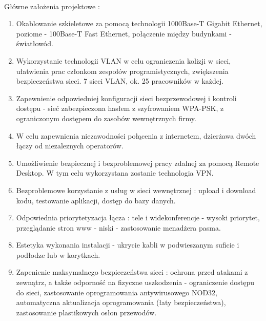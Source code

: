 \paragraph{}
Główne założenia projektowe :
\begin{enumerate}
	\item Okablowanie szkieletowe za pomocą technologii 1000Base-T Gigabit Ethernet, poziome - 100Base-T Fast Ethernet, połączenie między budynkami - światłowód.
	\item Wykorzystanie technologii VLAN w celu ograniczenia kolizji  w sieci, ułatwienia prac członkom zespołów programistycznych, zwiększenia bezpieczeństwa sieci. 7 sieci VLAN, ok. 25 pracowników w każdej.
	\item Zapewnienie odpowiedniej konfiguracji sieci bezprzewodowej i kontroli dostępu - sieć zabezpieczona hasłem z szyfrowaniem WPA-PSK, z ograniczonym dostępem do zasobów wewnętrznych firmy.
	\item W celu zapewnienia niezawodności połącenia z internetem, dzierżawa dwóch łączy od niezaleznych operatorów.
	\item Umożliwienie bezpiecznej i bezproblemowej pracy zdalnej za pomocą Remote Desktop. W tym celu wykorzystana zostanie technologia VPN.
	\item Bezproblemowe korzystanie z usług w sieci wewnętrznej : upload i download kodu, testowanie aplikacji, dostęp do bazy danych.
	\item Odpowiednia priorytetyzacja łącza : tele i widekonferencje - wysoki priorytet, przeglądanie stron www - niski - zastosowanie menadżera pasma.
	\item Estetyka wykonania instalacji - ukrycie kabli w podwieszanym suficie i podłodze lub w korytkach.
	\item Zapenienie maksymalnego bezpieczeństwa sieci : ochrona przed atakami z zewnątrz, a także odporność na fizyczne uszkodzenia - ograniczenie dostępu do sieci, zastosowanie oprogramowania antywirusowego NOD32, automatyczna aktualizacja oprogramowania (łaty bezpieczeństwa), zastosowanie plastikowych osłon przewodów.
\end{enumerate}
